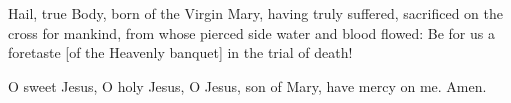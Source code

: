 \begin{otherlanguage}{english}Hail, true Body, born
of the Virgin Mary,
having truly suffered, sacrificed
on the cross for mankind,
from whose pierced side
water and blood flowed:
Be for us a foretaste [of the Heavenly banquet]
in the trial of death!

O sweet Jesus, O holy Jesus,
O Jesus, son of Mary,
have mercy on me. Amen.\end{otherlanguage}